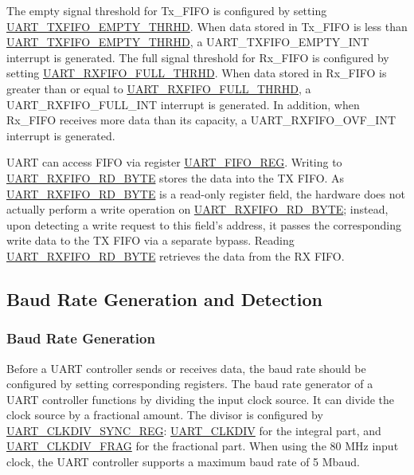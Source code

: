 \documentclass[main\_\_EN.tex]{subfiles}
\begin{document}
The empty signal threshold for Tx\_FIFO is configured by setting \hyperref[fielddesc:UARTTXFIFOEMPTYTHRHD]{UART\_TXFIFO\_EMPTY\_THRHD}. When data stored in Tx\_FIFO is less than \hyperref[fielddesc:UARTTXFIFOEMPTYTHRHD]{UART\_TXFIFO\_EMPTY\_THRHD}, a UART\_TXFIFO\_EMPTY\_INT interrupt is generated. The full signal threshold for Rx\_FIFO is configured by setting \hyperref[fielddesc:UARTRXFIFOFULLTHRHD]{UART\_RXFIFO\_FULL\_THRHD}. When data stored in Rx\_FIFO is greater than or equal to \hyperref[fielddesc:UARTRXFIFOFULLTHRHD]{UART\_RXFIFO\_FULL\_THRHD}, a UART\_RXFIFO\_FULL\_INT interrupt is generated. In addition, when Rx\_FIFO receives more data than its capacity, a UART\_RXFIFO\_OVF\_INT interrupt is generated.

UART can access FIFO via register \hyperref[regdesc:UARTFIFOREG]{UART\_FIFO\_REG}. Writing to \hyperref[fielddesc:UARTRXFIFORDBYTE]{UART\_RXFIFO\_RD\_BYTE} stores the data into the TX FIFO. As \hyperref[fielddesc:UARTRXFIFORDBYTE]{UART\_RXFIFO\_RD\_BYTE} is a read-only register field, the hardware does not actually perform a write operation on \hyperref[fielddesc:UARTRXFIFORDBYTE]{UART\_RXFIFO\_RD\_BYTE}; instead, upon detecting a write request to this field's address, it passes the corresponding write data to the TX FIFO via a separate bypass. Reading \hyperref[fielddesc:UARTRXFIFORDBYTE]{UART\_RXFIFO\_RD\_BYTE} retrieves the data from the RX FIFO.

\clearpage
\subsection{Baud Rate Generation and Detection}

\subsubsection{Baud Rate Generation}

Before a UART controller sends or receives data, the baud rate should be configured by setting corresponding registers. The baud rate generator of a UART controller functions by dividing the input clock source. It can divide the clock source by a fractional amount. The divisor is configured by \hyperref[regdesc:UARTCLKDIVSYNCREG]{UART\_CLKDIV\_SYNC\_REG}: \hyperref[fielddesc:UARTCLKDIV]{UART\_CLKDIV} for the integral part, and \hyperref[fielddesc:UARTCLKDIVFRAG]{UART\_CLKDIV\_FRAG} for the fractional part. When using the 80 MHz input clock, the UART controller supports a maximum baud rate of 5 Mbaud.
\end{document}

